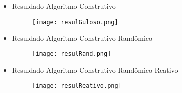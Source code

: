 \documentclass[12pt, fleqn]{article}
\begin{document}
      \begin{itemize}
	\item Resuldado Algoritmo Construtivo 
	\begin{figure}[!htpb]
	    \centering
	    \texttt{[image: resulGuloso.png]}
	\end{figure} 
	 \newpage
	\item Resuldado Algoritmo Construtivo Randômico
	\begin{figure}[!htpb]
	    \centering
	    \texttt{[image: resulRand.png]}
	\end{figure} 
	
	\item Resuldado Algoritmo Construtivo Randômico Reativo
	\begin{figure}[!htpb]
	    \centering
	    \texttt{[image: resulReativo.png]}
	\end{figure} 
      
      \end{itemize} 
    
    
    
\end{document}
